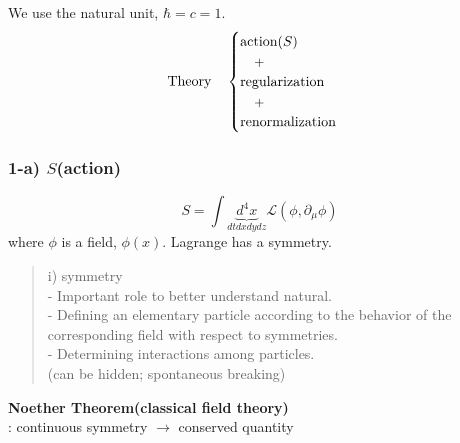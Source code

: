 \documentclass[11pt,letterpaper]{article}
\begin{document}
We use the natural unit, $\hbar = c = 1$.
%
\begin{align*}
 \textnormal{Theory} \quad
 \begin{cases}
  \textnormal{action}(S) \\
  \quad \small{\mbox{+}} \\
  \textnormal{regularization} \\
  \quad \small{\mbox{+}} \\
  \textnormal{renormalization}
 \end{cases}
\end{align*}


\subsubsection*{\normalfont \bfseries 1-a) $S$(action)}
%
\begin{equation*}
 S = \int \underbrace{d^{4}x}_{dtdxdydz} \mathcal{L}(\phi, \partial_{\mu}\phi)
\end{equation*}
%
where $\phi$ is a field, $\phi(x)$. Lagrange has a symmetry. \\

%

\begin{quote}
i) symmetry \\
- Important role to better understand natural. \\
- Defining an elementary particle according to the behavior of the corresponding field with respect to symmetries. \\
- Determining interactions among particles. \\
(can be hidden; spontaneous breaking) \\
%
\end{quote}

%

{\bf Noether Theorem(classical field theory)} \\
%
: continuous symmetry $\rightarrow$ conserved quantity

\VS
\end{document}
